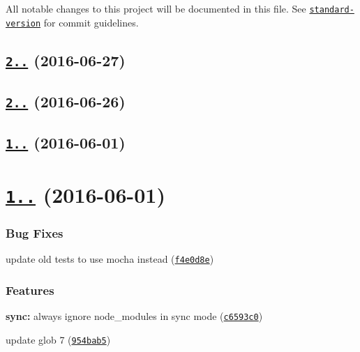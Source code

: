 All notable changes to this project will be documented in this file. See \href{https://github.com/conventional-changelog/standard-version}{\tt standard-\/version} for commit guidelines.

\label{_2.0.2}%
 \subsection*{\href{https://github.com/mklabs/node-fileset/compare/v1.0.1...v2.0.2}{\tt 2..} (2016-\/06-\/27)}

\label{_2.0.0}%
 \subsection*{\href{https://github.com/mklabs/node-fileset/compare/v1.0.1...v2.0.0}{\tt 2..} (2016-\/06-\/26)}

\label{_1.0.1}%
 \subsection*{\href{https://github.com/mklabs/node-fileset/compare/v1.0.0...v1.0.1}{\tt 1..} (2016-\/06-\/01)}

\label{_1.0.0}%
 \section*{\href{https://github.com/mklabs/node-fileset/compare/v0.2.1...v1.0.0}{\tt 1..} (2016-\/06-\/01)}

\subsubsection*{Bug Fixes}


\begin{DoxyItemize}
\item update old tests to use mocha instead (\href{https://github.com/mklabs/node-fileset/commit/f4e0d8e}{\tt f4e0d8e})
\end{DoxyItemize}

\subsubsection*{Features}


\begin{DoxyItemize}
\item {\bfseries sync\+:} always ignore node\+\_\+modules in sync mode (\href{https://github.com/mklabs/node-fileset/commit/c6593c0}{\tt c6593c0})
\item update glob 7 (\href{https://github.com/mklabs/node-fileset/commit/954bab5}{\tt 954bab5})
\end{DoxyItemize}

